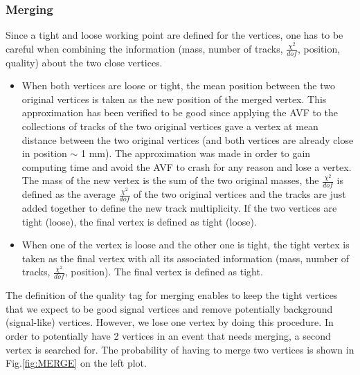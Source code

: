 \documentclass{cernatlasnote}
\begin{document}
        \subsubsection{Merging}
            Since a tight and loose working point are defined for the vertices, one has to be careful when combining the information (mass, number of tracks, $\frac{\chi^2}{dof}$, position, quality) about the two close vertices.
            \begin{itemize}
                \item When both vertices are loose or tight, the mean position between the two original vertices is taken as the new position of the merged vertex. This approximation has been verified to be good since applying the AVF to the collections of tracks of the two original vertices gave a vertex at mean distance between the two original vertices (and both vertices are already close in position $\sim$ 1 mm). The approximation was made in order to gain computing time and avoid the AVF to crash for any reason and lose a vertex. The mass of the new vertex is the sum of the two original masses, the $\frac{\chi^2}{dof}$ is defined as the average $\frac{\chi^2}{dof}$ of the two original vertices and the tracks are just added together to define the new track multiplicity. If the two vertices are tight (loose), the final vertex is defined as tight (loose).
                
                \item When one of the vertex is loose and the other one is tight, the tight vertex is taken as the final vertex with all its associated information  (mass, number of tracks, $\frac{\chi^2}{dof}$, position). The final vertex is defined as tight.
            \end{itemize}
        The definition of the quality tag for merging enables to keep the tight vertices that we expect to be good signal vertices and remove potentially background (signal-like) vertices. However, we lose one vertex by doing this procedure. In order to potentially have 2 vertices in an event that needs merging, a second vertex is searched for. The probability of having to merge two vertices is shown in Fig.\ref{fig:MERGE} on the left plot.
\end{document}
